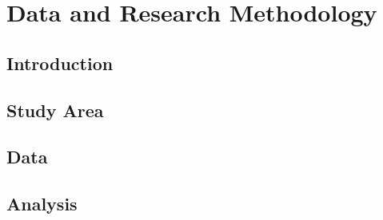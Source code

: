 \label{chapter3}
\boldmath

\chapter{Data and Research Methodology}

\section{Introduction}


\section{Study Area}

\section{Data}


\section{Analysis}





